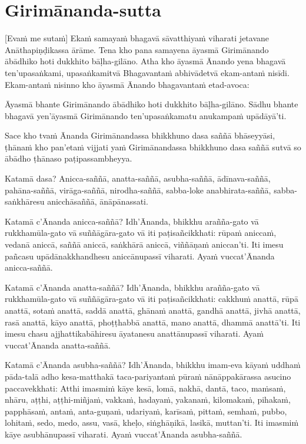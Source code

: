 \section{Girimānanda-sutta}

[Evaṁ me sutaṁ] 
Ekaṁ samayaṁ bhagavā sāvatthiyaṁ viharati jetavane
Anāthapiṇḍikassa ārāme. Tena kho pana samayena āyasmā Girimānando ābādhiko hoti
dukkhito bāḷha-gilāno. Atha kho āyasmā Ānando yena bhagavā ten’upasaṅkami,
upasaṅkamitvā Bhagavantaṁ abhivādetvā ekam-antaṁ nisīdi. Ekam-antaṁ nisinno kho
āyasmā Ānando bhagavantaṁ etad-avoca:

Āyasmā bhante Girimānando ābādhiko hoti dukkhito bāḷha-gilāno. Sādhu bhante
bhagavā yen’āyasmā Girimānando ten’upasaṅkamatu anukampaṁ upādāyā'ti.

Sace kho tvaṁ Ānanda Girimānandassa bhikkhuno dasa saññā bhāseyyāsi, ṭhānaṁ kho
pan’etaṁ vijjati yaṁ Girimānandassa bhikkhuno dasa saññā sutvā so ābādho ṭhānaso
paṭipassambheyya.

Katamā dasa? Anicca-saññā, anatta-saññā, asubha-saññā, ādīnava-saññā,
pahāna-saññā, virāga-saññā, nirodha-saññā, sabba-loke anabhirata-saññā,
sabba-saṅkhāresu anicchāsaññā, ānāpānassati.

Katamā c’Ānanda anicca-saññā? Idh’Ānanda, bhikkhu arañña-gato vā
rukkhamūla-gato vā suññāgāra-gato vā iti paṭisañcikkhati: rūpaṁ aniccaṁ, vedanā
aniccā, saññā aniccā, saṅkhārā aniccā, viññāṇaṁ aniccan’ti. Iti imesu pañcasu
upādānakkhandhesu aniccānupassī viharati. Ayaṁ vuccat’Ānanda anicca-saññā.

Katamā c’Ānanda anatta-saññā? Idh’Ānanda, bhikkhu arañña-gato vā
rukkhamūla-gato vā suññāgāra-gato vā iti paṭisañcikkhati: cakkhuṁ anattā, rūpā
anattā, sotaṁ anattā, saddā anattā, ghānaṁ anattā, gandhā anattā, jivhā anattā,
rasā anattā, kāyo anattā, phoṭṭhabbā anattā, mano anattā, dhammā anattā’ti. Iti
imesu chasu ajjhattikabāhiresu āyatanesu anattānupassī viharati. Ayaṁ
vuccat’Ānanda anatta-saññā.

Katamā c’Ānanda asubha-saññā? Idh’Ānanda, bhikkhu imam-eva kāyaṁ uddhaṁ
pāda-talā adho kesa-matthakā taca-pariyantaṁ pūraṁ nānāppakārassa asucino
paccavekkhati: Atthi imasmiṁ kāye kesā, lomā, nakhā, dantā, taco, maṁsaṁ,
nhāru, aṭṭhi, aṭṭhi-miñjaṁ, vakkaṁ, hadayaṁ, yakanaṁ, kilomakaṁ, pihakaṁ,
papphāsaṁ, antaṁ, anta-guṇaṁ, udariyaṁ, karīsaṁ, pittaṁ, semhaṁ, pubbo, lohitaṁ,
sedo, medo, assu, vasā, kheḷo, siṅghāṇikā, lasikā, muttan’ti. Iti imasmiṁ kāye
asubhānupassī viharati. Ayaṁ vuccat’Ānanda asubha-saññā.

